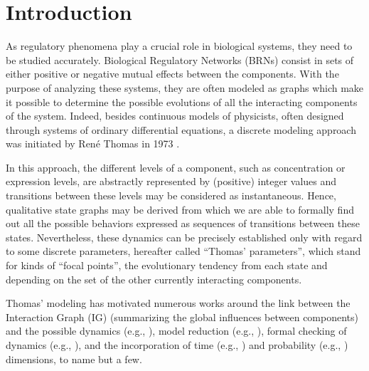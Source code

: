 \section{Introduction}\label{sec:intro}

As regulatory phenomena play a crucial role in biological systems, they need to be studied accurately.
Biological Regulatory Networks (BRNs) consist in sets of either positive or negative mutual effects between the components.
With the purpose of analyzing these systems, they are often modeled as graphs which make it possible to determine the possible evolutions of all the interacting components of the system.
Indeed, besides continuous models of physicists, often designed through systems of ordinary
differential equations, a discrete modeling approach was initiated by René Thomas in 1973
\cite{Thomas73}.

In this approach, the different levels of a component, such as concentration or expression levels, are abstractly represented by (positive) integer values and transitions between these levels may be considered as instantaneous.
Hence, qualitative state graphs may be derived from which we are able to formally find out all the possible behaviors expressed as sequences of transitions between these states.
Nevertheless, these dynamics can be precisely established only with regard to some discrete parameters,
hereafter called ``Thomas' parameters'',
which stand for kinds of ``focal points'', \ie the evolutionary tendency from each state and depending on the set of the other currently interacting components.

Thomas' modeling has motivated numerous works around the link between the Interaction Graph (IG)
(summarizing the global influences between components) and the possible dynamics (e.g.,
\cite{RiCo07,RRT08}),
model reduction (e.g., \cite{Naldi09}), formal checking of dynamics (e.g., \cite{Richard06,Naldi07}), 
and the incorporation of time (e.g., \cite{Siebert06,Ahmad08}) and probability
(e.g., \cite{Twardziok10-CMSB}) dimensions, to name but a few.


